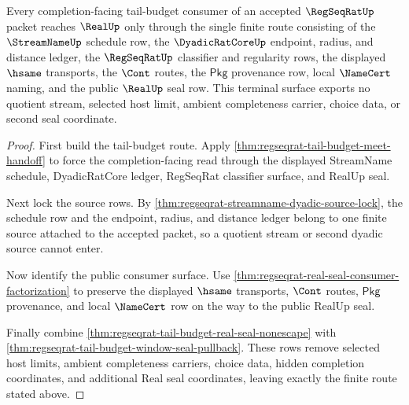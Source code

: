 \begin{theorem}
\label{thm:regseqrat-tail-budget-terminal-real-seal}
Every completion-facing tail-budget consumer of an accepted $\RegSeqRatUp$
packet reaches $\RealUp$ only through the single finite route consisting of the
$\StreamNameUp$ schedule row, the $\DyadicRatCoreUp$ endpoint, radius, and
distance ledger, the $\RegSeqRatUp$ classifier and regularity rows, the
displayed $\hsame$ transports, the $\Cont$ routes, the $\mathsf{Pkg}$
provenance row, local $\NameCert$ naming, and the public $\RealUp$ seal row.
This terminal surface exports no quotient stream, selected host limit, ambient
completeness carrier, choice data, or second seal coordinate.
\end{theorem}
\begin{proof}
First build the tail-budget route. Apply
\autoref{thm:regseqrat-tail-budget-meet-handoff} to force the
completion-facing read through the displayed StreamName schedule,
DyadicRatCore ledger, RegSeqRat classifier surface, and RealUp seal.

Next lock the source rows. By
\autoref{thm:regseqrat-streamname-dyadic-source-lock}, the schedule row and the
endpoint, radius, and distance ledger belong to one finite source attached to
the accepted packet, so a quotient stream or second dyadic source cannot enter.

Now identify the public consumer surface. Use
\autoref{thm:regseqrat-real-seal-consumer-factorization} to preserve the
displayed $\hsame$ transports, $\Cont$ routes, $\mathsf{Pkg}$ provenance, and
local $\NameCert$ row on the way to the public RealUp seal.

Finally combine
\autoref{thm:regseqrat-tail-budget-real-seal-nonescape} with
\autoref{thm:regseqrat-tail-budget-window-seal-pullback}. These rows remove
selected host limits, ambient completeness carriers, choice data, hidden
completion coordinates, and additional Real seal coordinates, leaving exactly
the finite route stated above.
\end{proof}
